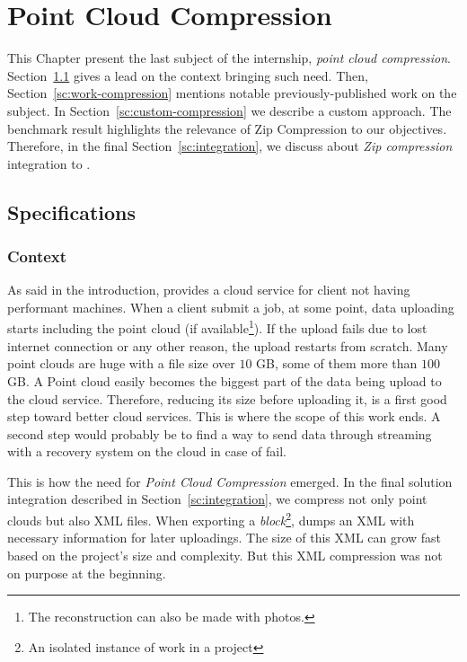 \chapter{Point Cloud Compression}
\label{ch:compression}
This Chapter present the last subject of the internship, \emph{point cloud compression}. Section~\ref{sc:spec-compression} gives a lead on the context bringing such need. Then, Section~\ref{sc:work-compression} mentions notable previously-published work on the subject. In Section~\ref{sc:custom-compression} we describe a custom approach. The benchmark result highlights the relevance of Zip Compression to our objectives. Therefore, in the final Section~\ref{sc:integration}, we discuss about \emph{Zip compression} integration to \CC.

\section{Specifications}
\label{sc:spec-compression}

\subsection{Context}
As said in the introduction, \CC provides a cloud service for client not having performant machines. When a client submit a job, at some point, data uploading starts including the point cloud (if available\footnote{The reconstruction can also be made with photos.}). If the upload fails due to lost internet connection or any other reason, the upload restarts from scratch. Many point clouds are huge with a file size over $10$ GB, some of them more than $100$ GB. A Point cloud
easily becomes the biggest part of the data being upload to the cloud service. Therefore, reducing its size before uploading it, is a first good step toward better cloud services. This is where the scope of this work ends. A second step would probably be to find a way to send data through streaming with a recovery system on the cloud in case of fail.

This is how the need for \emph{Point Cloud Compression} emerged. In the final solution integration described in Section~\ref{sc:integration}, we compress not only point clouds but also XML files. When exporting a \emph{block}\footnote{An isolated instance of work in a \CC project}, \CC dumps an XML with necessary information for later uploadings. The size of this XML can grow fast based on the project's size and complexity. But this XML compression was not on purpose at the beginning.

